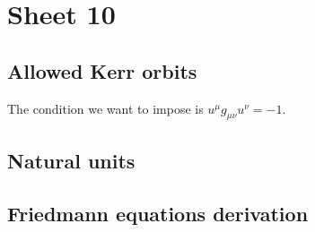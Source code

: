 \documentclass[main.tex]{subfiles}
\begin{document}
\section{Sheet 10}

\subsection{Allowed Kerr orbits}

The condition we want to impose is \(u^{\mu } g_{\mu \nu } u^{\nu } = -1\). 

\subsection{Natural units}

\subsection{Friedmann equations derivation}
\end{document}
